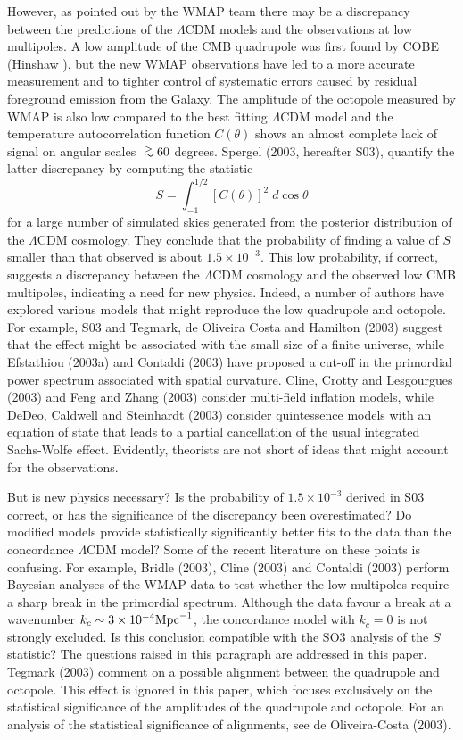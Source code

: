 However, as pointed out by the WMAP team there may be a discrepancy
between the predictions of the $\Lambda$CDM models and the
observations at low multipoles. A low amplitude of the CMB quadrupole
was first found by COBE (Hinshaw ), but the new WMAP
observations have led to a more accurate measurement and to tighter
control of systematic errors caused by  residual foreground
emission from the Galaxy. The amplitude of the octopole
measured by WMAP is also low compared to the best fitting
$\Lambda$CDM model and the temperature autocorrelation function
$C(\theta)$ shows  an almost complete lack of signal on angular
scales $\simgt 60$ degrees. Spergel \etals (2003, hereafter S03), 
quantify the latter discrepancy by computing the statistic
\begin{equation}
S = \int_{-1}^{1/2} \left [ C(\theta) \right ]^2 \; d\cos\theta
\end{equation}
for a large number of simulated skies generated from the posterior
distribution of the $\Lambda$CDM cosmology. They conclude  that the
probability of finding a value of $S$ smaller than that observed is
about $1.5 \times 10^{-3}$. This low probability, if correct, suggests
a discrepancy between the $\Lambda$CDM cosmology and the observed low
CMB multipoles,  indicating a need for new physics.  Indeed, a number of
authors have explored various models that might reproduce the low
quadrupole and octopole. For example, S03 and Tegmark, de Oliveira
Costa and Hamilton (2003) suggest that the effect might be associated
with the small size of a finite universe, while Efstathiou (2003a) and
Contaldi \etals (2003) have proposed a cut-off in the primordial power
spectrum associated with spatial curvature.  Cline, Crotty and
Lesgourgues (2003) and  Feng and Zhang (2003) consider multi-field
inflation models, while DeDeo, Caldwell and Steinhardt (2003) consider
quintessence models with an equation of state that leads to a partial
cancellation of the usual integrated Sachs-Wolfe effect.  Evidently,
theorists are not short of ideas that might account for the
observations.

But is new physics necessary? Is the probability of $1.5 \times
10^{-3}$ derived in S03 correct, or has the significance of the
discrepancy been overestimated? Do modified models provide
statistically significantly better fits to the data than the
concordance $\Lambda$CDM model?  Some of the recent literature on
these points is confusing. For example,
Bridle \etals (2003), Cline \etals (2003) and Contaldi \etals
(2003)  perform Bayesian analyses of the WMAP data
to test whether the low multipoles require a sharp break in the
primordial spectrum.  Although the data favour a break at a wavenumber
$k_c \sim 3 \times 10^{-4} {\rm Mpc}^{-1}$, the concordance model with
$k_c = 0$ is not strongly excluded.  Is this conclusion compatible
with the SO3 analysis of the $S$ statistic? The questions raised in
this paragraph are addressed in this paper. Tegmark \etals (2003) comment
on a possible alignment between the quadrupole and octopole. This effect
is ignored in this paper, which  focuses exclusively on the
statistical significance of the amplitudes of the quadrupole and octopole.
For an analysis of the statistical significance of alignments,
see de Oliveira-Costa \etals (2003).



